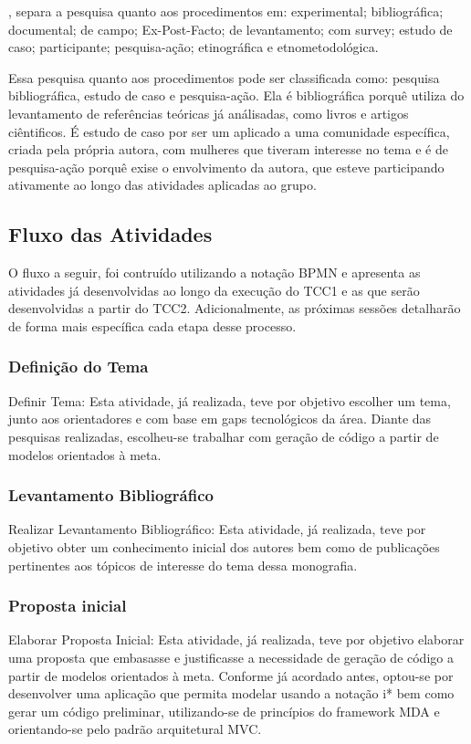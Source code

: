 , separa a pesquisa quanto aos 
procedimentos em: experimental; bibliográfica; 
documental; de campo; Ex-Post-Facto; 
de levantamento; com survey; estudo de caso; 
participante; pesquisa-ação; etinográfica e etnometodológica.

Essa pesquisa quanto aos procedimentos pode ser classificada como: pesquisa bibliográfica, 
estudo de caso e pesquisa-ação.
Ela é bibliográfica porquê utiliza do levantamento de referências teóricas já análisadas, como livros e artigos ciêntificos. É estudo de caso por 
ser um aplicado a uma comunidade específica, criada pela própria autora, com 
mulheres que tiveram interesse no tema e é de 
pesquisa-ação porquê exise o envolvimento da autora, 
que esteve participando ativamente ao longo das 
atividades aplicadas ao grupo.


\subsection{Fluxo das Atividades}

O fluxo a seguir, foi contruído utilizando a notação BPMN e apresenta 
as atividades já desenvolvidas ao longo da execução do 
TCC1 e as que serão desenvolvidas a partir do TCC2. 
Adicionalmente, as próximas sessões detalharão de 
forma mais específica cada etapa desse processo.


\subsubsection{Definição do Tema}
Definir Tema: Esta atividade, já realizada, teve por objetivo escolher um tema,
junto aos orientadores e com base em gaps tecnológicos da área. Diante das pesquisas
realizadas, escolheu-se trabalhar com geração de código a partir de modelos orientados à
meta.
\subsubsection{Levantamento Bibliográfico}
Realizar Levantamento Bibliográfico: Esta atividade, já realizada, teve por
objetivo obter um conhecimento inicial dos autores bem como de publicações pertinentes
aos tópicos de interesse do tema dessa monografia.

\subsubsection{Proposta inicial}
Elaborar Proposta Inicial: Esta atividade, já realizada, teve por objetivo elaborar uma proposta que embasasse e justificasse a necessidade de geração de código a
partir de modelos orientados à meta. Conforme já acordado antes, optou-se por desenvolver uma aplicação que permita modelar usando a notação i* bem como gerar um código
preliminar, utilizando-se de princípios do framework MDA e orientando-se pelo padrão
arquitetural MVC.
